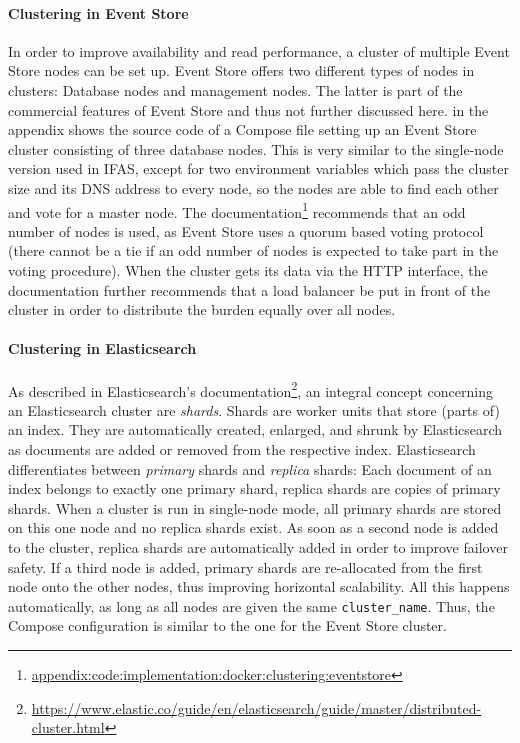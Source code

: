 \paragraph{Clustering in Event Store}
In order to improve availability and read performance, a cluster of multiple Event Store nodes can be set up.
Event Store offers two different types of nodes in clusters: Database nodes and management nodes.
The latter is part of the commercial features of Event Store and thus not further discussed here.
 in the appendix shows the source code of a Compose file setting up an Event Store cluster consisting of three database nodes.
This is very similar to the single-node version used in \ac{IFAS}, except for two environment variables which pass the cluster size and its DNS address to every node, so the nodes are able to find each other and vote for a master node.
The documentation\footnote{\url{appendix:code:implementation:docker:clustering:eventstore}} recommends that an odd number of nodes is used, as Event Store uses a quorum based voting protocol (there cannot be a tie if an odd number of nodes is expected to take part in the voting procedure).
When the cluster gets its data via the \ac{HTTP} interface, the documentation further recommends that a load balancer be put in front of the cluster in order to distribute the burden equally over all nodes.

\paragraph{Clustering in Elasticsearch}
As described in Elasticsearch's documentation\footnote{\url{https://www.elastic.co/guide/en/elasticsearch/guide/master/distributed-cluster.html}}, an integral concept concerning an Elasticsearch cluster are \emph{shards}.
Shards are worker units that store (parts of) an index.
They are automatically created, enlarged, and shrunk by Elasticsearch as documents are added or removed from the respective index.
Elasticsearch differentiates between \emph{primary} shards and \emph{replica} shards: Each document of an index belongs to exactly one primary shard, replica shards are copies of primary shards.
When a cluster is run in single-node mode, all primary shards are stored on this one node and no replica shards exist.
As soon as a second node is added to the cluster, replica shards are automatically added in order to improve failover safety.
If a third node is added, primary shards are re-allocated from the first node onto the other nodes, thus improving horizontal scalability.
All this happens automatically, as long as all nodes are given the same \texttt{cluster\_name}.
Thus, the Compose configuration is similar to the one for the Event Store cluster.

